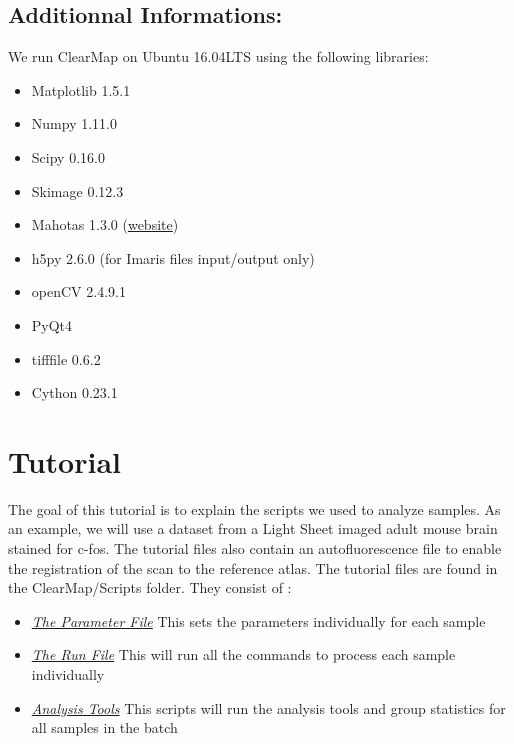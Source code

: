 \documentclass[letterpaper,10pt,english]{sphinxmanual}
\begin{document}
\subsection{Additionnal Informations:}
\label{installation:additionnal-informations}
We run ClearMap on Ubuntu 16.04LTS using the following libraries:
\begin{itemize}
\item {} 
Matplotlib 1.5.1

\item {} 
Numpy 1.11.0

\item {} 
Scipy 0.16.0

\item {} 
Skimage 0.12.3

\item {} 
Mahotas 1.3.0 (\href{http://luispedro.org/software/mahotas/}{website})

\item {} 
h5py 2.6.0 (for Imaris files input/output only)

\item {} 
openCV 2.4.9.1

\item {} 
PyQt4

\item {} 
tifffile 0.6.2

\item {} 
Cython 0.23.1

\end{itemize}


\section{Tutorial}
\label{tutorial::doc}\label{tutorial:tutorial}
The goal of this tutorial is to explain the scripts we used to analyze samples. As an example, we will use a dataset from a Light Sheet imaged adult mouse brain stained for c-fos. The tutorial files also contain an autofluorescence file to enable the registration of the scan to the reference atlas. The tutorial files are found in the ClearMap/Scripts folder. They consist of :
\begin{itemize}
\item {} 
{\hyperref[tutorial:the-parameter-file]{\emph{The Parameter File}}} This sets the parameters individually for each sample

\item {} 
{\hyperref[tutorial:the-run-file]{\emph{The Run File}}} This will run all the commands to process each sample individually

\item {} 
{\hyperref[tutorial:analysis-tools]{\emph{Analysis Tools}}} This scripts will run the analysis tools and group statistics for all samples in the batch

\end{itemize}
\end{document}
